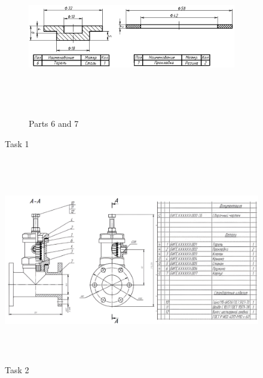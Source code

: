 \documentclass[12pt]{article}
\begin{document}
\begin{figure}[H]
    \begin{subfigure}{0.99\textwidth}
        \centering\includegraphics[height=7cm,width=1\textwidth,keepaspectratio]{resources_CAD/global_var1/t67.png}
        \caption{Parts 6 and 7}
        \label{fig:resources_CAD/global_var1/t67.png}
    \end{subfigure}

\caption{Task 1}
\label{fig:t12}
\end{figure}

\begin{figure}[H]
    \centering\includegraphics[height=9cm,width=1\textwidth,keepaspectratio]{resources_CAD/global_var1/h2.png}
    \caption{Task 2}
    \label{fig:resources_CAD/global_var1/h2.png}
\end{figure}
\newpage
\end{document}
